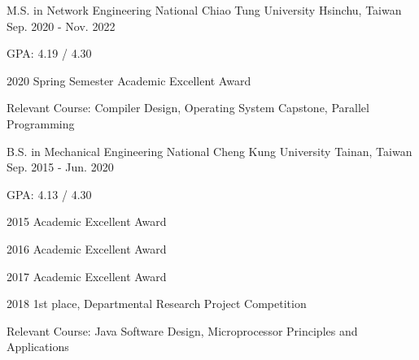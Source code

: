 

\begin{cventries}

  \cventry
    {M.S. in Network Engineering} %
    {National Chiao Tung University} %
    {Hsinchu, Taiwan} %
    {Sep. 2020 - Nov. 2022} %
    {
      \begin{cvitems} %
        \item {GPA: 4.19 / 4.30}
        \item {2020 Spring Semester Academic Excellent Award}
        \item {Relevant Course: Compiler Design, Operating System Capstone, Parallel Programming}
      \end{cvitems}
    }

  \cventry
    {B.S. in Mechanical Engineering} %
    {National Cheng Kung University} %
    {Tainan, Taiwan} %
    {Sep. 2015 - Jun. 2020} %
    {
      \vspace{14pt}
      \begin{cvitems} %
        \item {GPA: 4.13 / 4.30}
        \item {2015 Academic Excellent Award}
        \item {2016 Academic Excellent Award}
        \item {2017 Academic Excellent Award}
        \item {2018 1st place, Departmental Research Project Competition}
        \item {Relevant Course: Java Software Design, Microprocessor Principles and Applications}
      \end{cvitems}
    }

\end{cventries}
